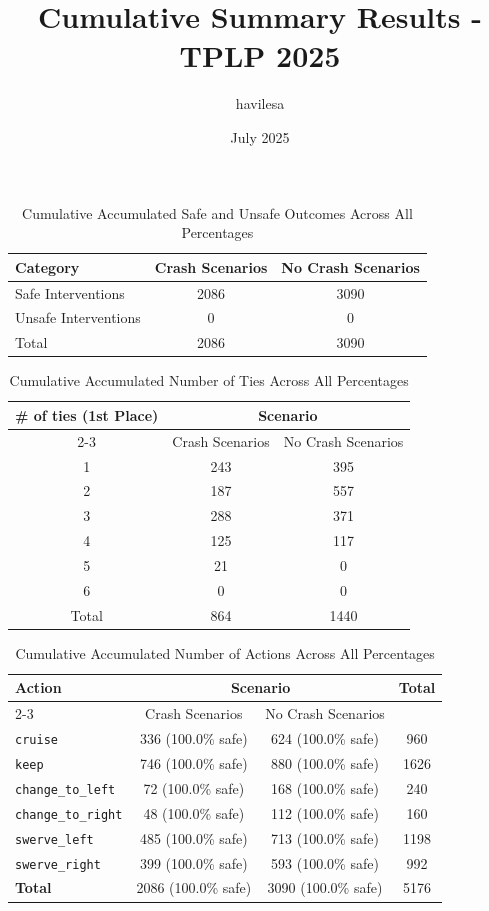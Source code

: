 \documentclass{article}
\title{Cumulative Summary Results - TPLP 2025}
\author{havilesa}
\date{July 2025}
\begin{document}
\maketitle

\begin{table}[h]
\centering
\caption{Cumulative Accumulated Safe and Unsafe Outcomes Across All Percentages}
\begin{tabular}{l|cc}
\toprule
Category & Crash Scenarios & No Crash Scenarios \\
\midrule
Safe Interventions & 2086 & 3090 \\ 
Unsafe Interventions & 0 & 0 \\ 
\midrule
Total & 2086 & 3090 \\ 
\bottomrule
\end{tabular}
\end{table}

\begin{table}[h]
\centering
\caption{Cumulative Accumulated Number of Ties Across All Percentages}
\begin{tabular}{c|cc}
\toprule
\multirow{2}{*}{\# of ties (1st Place)} & \multicolumn{2}{c|}{Scenario} \\
\cmidrule{2-3}
 & Crash Scenarios & No Crash Scenarios \\
\midrule
1 & 243 & 395 \\ 
2 & 187 & 557 \\ 
3 & 288 & 371 \\ 
4 & 125 & 117 \\ 
5 & 21 & 0 \\ 
6 & 0 & 0 \\ 
\midrule
Total & 864 & 1440 \\ 
\bottomrule
\end{tabular}
\end{table}

\begin{table}[h]
\centering
\caption{Cumulative Accumulated Number of Actions Across All Percentages}
\begin{tabular}{l|cc|c}
\toprule
\multirow{2}{*}{Action} & \multicolumn{2}{c|}{Scenario} & \multirow{2}{*}{Total} \\
\cmidrule{2-3}
 & Crash Scenarios & No Crash Scenarios \\
\midrule
\texttt{cruise} & 336 (100.0\% safe) & 624 (100.0\% safe) & 960 \\ 
\texttt{keep} & 746 (100.0\% safe) & 880 (100.0\% safe) & 1626 \\ 
\texttt{change\_to\_left} & 72 (100.0\% safe) & 168 (100.0\% safe) & 240 \\ 
\texttt{change\_to\_right} & 48 (100.0\% safe) & 112 (100.0\% safe) & 160 \\ 
\texttt{swerve\_left} & 485 (100.0\% safe) & 713 (100.0\% safe) & 1198 \\ 
\texttt{swerve\_right} & 399 (100.0\% safe) & 593 (100.0\% safe) & 992 \\ 
\midrule
\textbf{Total} & 2086 (100.0\% safe) & 3090 (100.0\% safe) & 5176 \\ 
\bottomrule
\end{tabular}
\end{table}
\end{document}

